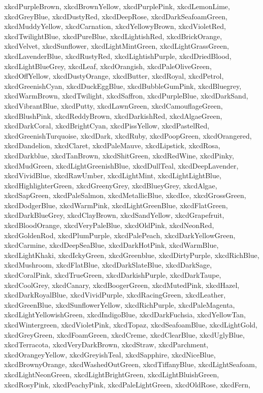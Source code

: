 \documentclass[12pt]{article}
\begin{document}
{{xkcdPurpleBrown,
xkcdBrownYellow,
xkcdPurplePink,
xkcdLemonLime,
xkcdGreyBlue,
xkcdDustyRed,
xkcdDeepRose,
xkcdDarkSeafoamGreen,
xkcdMuddyYellow,
xkcdCarnation,
xkcdYellowyBrown,
xkcdVioletRed,
xkcdTwilightBlue,
xkcdPureBlue,
xkcdLightishRed,
xkcdBrickOrange,
xkcdVelvet,
xkcdSunflower,
xkcdLightMintGreen,
xkcdLightGrassGreen,
xkcdLavenderBlue,
xkcdRustyRed,
xkcdLightishPurple,
xkcdDriedBlood,
xkcdLightBlueGrey,
xkcdLeaf,
xkcdOrangish,
xkcdPaleOliveGreen,
xkcdOffYellow,
xkcdDustyOrange,
xkcdButter,
xkcdRoyal,
xkcdPetrol,
xkcdGreenishCyan,
xkcdDuckEggBlue,
xkcdBubbleGumPink,
xkcdBluegrey,
xkcdWarmBrown,
xkcdTwilight,
xkcdSaffron,
xkcdPurpleBlue,
xkcdDarkSand,
xkcdVibrantBlue,
xkcdPutty,
xkcdLawnGreen,
xkcdCamouflageGreen,
xkcdBlushPink,
xkcdReddyBrown,
xkcdDarkishRed,
xkcdAlgaeGreen,
xkcdDarkCoral,
xkcdBrightCyan,
xkcdPissYellow,
xkcdPastelRed,
xkcdGreenishTurquoise,
xkcdDark,
xkcdRuby,
xkcdPoopGreen,
xkcdOrangered,
xkcdDandelion,
xkcdClaret,
xkcdPaleMauve,
xkcdLipstick,
xkcdRosa,
xkcdDarkblue,
xkcdTanBrown,
xkcdShitGreen,
xkcdRedWine,
xkcdPinky,
xkcdMudGreen,
xkcdLightGreenishBlue,
xkcdDullTeal,
xkcdDeepLavender,
xkcdVividBlue,
xkcdRawUmber,
xkcdLightMint,
xkcdLightLightBlue,
xkcdHighlighterGreen,
xkcdGreenyGrey,
xkcdBlueyGrey,
xkcdAlgae,
xkcdSapGreen,
xkcdPaleSalmon,
xkcdMetallicBlue,
xkcdIce,
xkcdGrossGreen,
xkcdDodgerBlue,
xkcdWarmPink,
xkcdLightGreenBlue,
xkcdFlatGreen,
xkcdDarkBlueGrey,
xkcdClayBrown,
xkcdSandYellow,
xkcdGrapefruit,
xkcdBloodOrange,
xkcdVeryPaleBlue,
xkcdOldPink,
xkcdNeonRed,
xkcdGoldenRod,
xkcdPlumPurple,
xkcdPalePeach,
xkcdDarkYellowGreen,
xkcdCarmine,
xkcdDeepSeaBlue,
xkcdDarkHotPink,
xkcdWarmBlue,
xkcdLightKhaki,
xkcdIckyGreen,
xkcdGreenblue,
xkcdDirtyPurple,
xkcdRichBlue,
xkcdMushroom,
xkcdFlatBlue,
xkcdDarkSlateBlue,
xkcdDarkSage,
xkcdCoralPink,
xkcdTrueGreen,
xkcdDarkishPurple,
xkcdDarkTaupe,
xkcdCoolGrey,
xkcdCanary,
xkcdBoogerGreen,
xkcdMutedPink,
xkcdHazel,
xkcdDarkRoyalBlue,
xkcdVividPurple,
xkcdRacingGreen,
xkcdLeather,
xkcdGreenBlue,
xkcdSunflowerYellow,
xkcdRichPurple,
xkcdPaleMagenta,
xkcdLightYellowishGreen,
xkcdIndigoBlue,
xkcdDarkFuchsia,
xkcdYellowTan,
xkcdWintergreen,
xkcdVioletPink,
xkcdTopaz,
xkcdSeafoamBlue,
xkcdLightGold,
xkcdGreyGreen,
xkcdFoamGreen,
xkcdCreme,
xkcdClearBlue,
xkcdUglyBlue,
xkcdTerracota,
xkcdVeryDarkBrown,
xkcdStraw,
xkcdParchment,
xkcdOrangeyYellow,
xkcdGreyishTeal,
xkcdSapphire,
xkcdNiceBlue,
xkcdBrownyOrange,
xkcdWashedOutGreen,
xkcdTiffanyBlue,
xkcdLightSeafoam,
xkcdLightNeonGreen,
xkcdLightBrightGreen,
xkcdLightBluishGreen,
xkcdRosyPink,
xkcdPeachyPink,
xkcdPaleLightGreen,
xkcdOldRose,
xkcdFern,
}}
\end{document}
